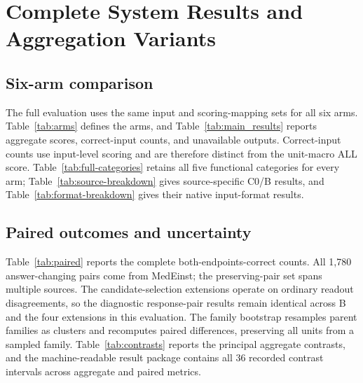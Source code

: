 \section{Complete System Results and Aggregation Variants}
\label{app:full}

\subsection{Six-arm comparison}
The full evaluation uses the same input and scoring-mapping sets for all six arms. Table~\ref{tab:arms} defines the arms, and Table~\ref{tab:main_results} reports aggregate scores, correct-input counts, and unavailable outputs. Correct-input counts use input-level scoring and are therefore distinct from the unit-macro ALL score. Table~\ref{tab:full-categories} retains all five functional categories for every arm; Table~\ref{tab:source-breakdown} gives source-specific C0/B results, and Table~\ref{tab:format-breakdown} gives their native input-format results.







\subsection{Paired outcomes and uncertainty}
Table~\ref{tab:paired} reports the complete both-endpoints-correct counts. All 1,780 answer-changing pairs come from MedEinst; the preserving-pair set spans multiple sources. The candidate-selection extensions operate on ordinary readout disagreements, so the diagnostic response-pair results remain identical across B and the four extensions in this evaluation. The family bootstrap resamples parent families as clusters and recomputes paired differences, preserving all units from a sampled family. Table~\ref{tab:contrasts} reports the principal aggregate contrasts, and the machine-readable result package contains all 36 recorded contrast intervals across aggregate and paired metrics.




